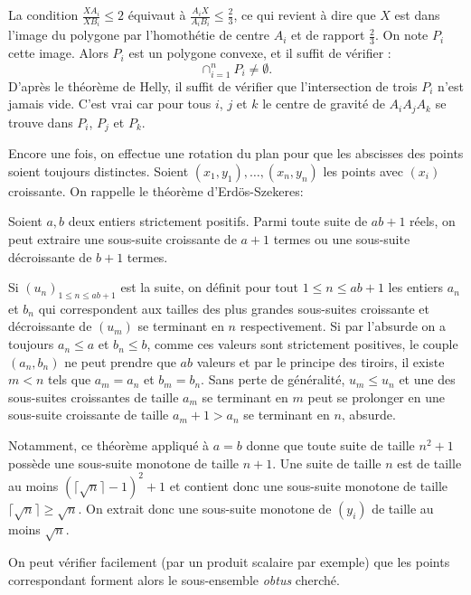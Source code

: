 \begin{sol}
La condition $\frac{XA_i}{XB_i}\le2$ équivaut à $\frac{A_iX}{A_iB_i}\le \frac 23$, ce qui revient à dire que $X$ est dans l’image du polygone par l’homothétie de centre $A_i$ et de rapport $\frac 23$. On note $P_i$ cette image. Alors $P_i$ est un polygone convexe, et il suffit de vérifier :
$$\cap_{i=1}^nP_i \ne \emptyset. $$
D’après le théorème de Helly, il suffit de vérifier que l’intersection de trois $P_i$ n’est jamais vide. C’est vrai car pour tous $i$, $j$ et $k$ le centre de gravité de $A_iA_jA_k$ se trouve dans $P_i$, $P_j$ et $P_k$.
\end{sol}


\begin{sol}
Encore une fois, on effectue une rotation du plan pour que les abscisses des points soient toujours distinctes. Soient $(x_1,y_1),\ldots,(x_n,y_n)$ les points avec $(x_i)$ croissante. On rappelle le théorème d'Erdös-Szekeres:

\begin{thm}
Soient $a,b$ deux entiers strictement positifs. Parmi toute suite de $ab+1$ réels, on peut extraire une sous-suite croissante de $a+1$ termes ou une sous-suite décroissante de $b+1$ termes.
\end{thm}

\begin{preuve}
Si $(u_n)_{1\le n\le ab+1}$ est la suite, on définit pour tout $1\le n\le ab+1$ les entiers $a_n$ et $b_n$ qui correspondent aux tailles des plus grandes sous-suites croissante et décroissante de $(u_m)$ se terminant en $n$ respectivement. Si par l'absurde on a toujours $a_n\le a$ et $b_n\le b$, comme ces valeurs sont strictement positives, le couple $(a_n,b_n)$ ne peut prendre que $ab$ valeurs et par le principe des tiroirs, il existe $m<n$ tels que $a_m=a_n$ et $b_m=b_n$. Sans perte de généralité, $u_m\le u_n$ et une des sous-suites croissantes de taille $a_m$ se terminant en $m$ peut se prolonger en une sous-suite croissante de taille $a_m+1>a_n$ se terminant en $n$, absurde.
\end{preuve}

Notamment, ce théorème appliqué à $a=b$ donne que toute suite de taille $n^2+1$ possède une sous-suite monotone de taille $n+1$. Une suite de taille $n$ est de taille au moins $(\lceil\sqrt n\rceil-1)^2+1$ et contient donc une sous-suite monotone de taille $\lceil\sqrt n\rceil\ge \sqrt n$. On extrait donc une sous-suite monotone de $(y_i)$ de taille au moins $\sqrt n$.

On peut vérifier facilement (par un produit scalaire par exemple) que les points correspondant forment alors le sous-ensemble \textit{obtus} cherché.
\end{sol}


